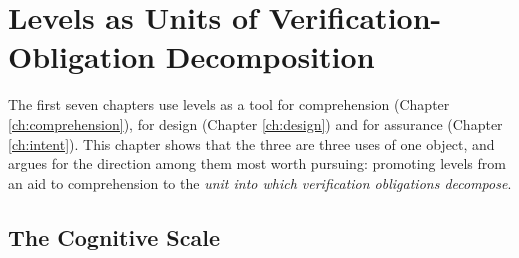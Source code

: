 \chapter{Levels as Units of Verification-Obligation Decomposition}\label{ch:levels}

The first seven chapters use levels as a tool for comprehension
(Chapter \ref{ch:comprehension}), for design (Chapter \ref{ch:design}) and for assurance
(Chapter \ref{ch:intent}). This chapter shows that the three are three uses of one object,
and argues for the direction among them most worth pursuing: promoting levels from an aid to
comprehension to the \emph{unit into which verification obligations decompose}.

\section{The Cognitive Scale}\label{sec:levels-def}

